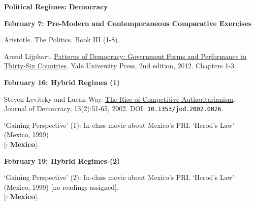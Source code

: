 \documentclass[letterpaper]{article}
\renewenvironment{itemize}{
  \begin{list}{}{
    \setlength{\leftmargin}{1.5em}
  }
}{
  \end{list}
}
\begin{document}
\begin{enumerate}
\item {\bf Political Regimes: Democracy}
	\begin{itemize}
		\item {\bf February 7: Pre-Modern and Contemporaneous Comparative Exercises}
			\begin{itemize}
				\item[$\bullet$] Aristotle. \href{https://socialsciences.mcmaster.ca/econ/ugcm/3ll3/aristotle/Politics.pdf}{The Politics}. Book III (1-8).%
				\item[$\bullet$] Arend Lijphart. \href{https://e-edu.nbu.bg/pluginfile.php/830138/mod_resource/content/1/Lijphart%2C%20A.%20Patterns%20of%20Democracy%20-%20Government%20Forms%20and%20Performance%20in%20Thirty-Six%20Countries%20%282012%29.pdf}{Patterns of Democracy: Government Forms and Performance in Thirty-Six Countries}. Yale University Press, 2nd edition, 2012. Chapters 1-3. %
			\end{itemize}
	\end{itemize}


\vspace{3mm}

\begin{itemize}

		\item {\bf February 16: Hybrid Regimes (1)}
			\begin{itemize}
				\item[$\bullet$] Steven Levitsky and Lucan Way. \href{http://muse.jhu.edu/article/17196}{The Rise of Competitive Authoritarianism}. Journal of Democracy, 13(2):51-65, 2002. DOI: \texttt{10.1353/jod.2002.0026}.
				\item[$\bullet$] `Gaining Perspective' (1): In-class movie about Mexico's PRI. `Herod's Law' (Mexico, 1999)\\
			{\color{brown}[\faGlobe: {\bf Mexico}].}

			\end{itemize}

		\item {\bf February 19: Hybrid Regimes (2)}
			\begin{itemize}
				\item[$\bullet$] `Gaining Perspective' (2): In-class movie about Mexico's PRI. `Herod's Law' (Mexico, 1999) [no readings assigned].\\
			{\color{brown}[\faGlobe: {\bf Mexico}].}


\end{itemize}
\end{itemize}
\end{enumerate}
\end{document}
